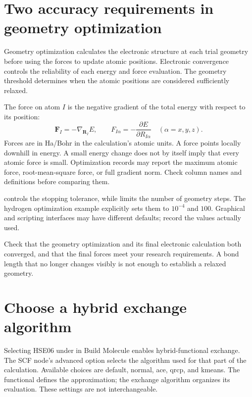 \section{Two accuracy requirements in geometry optimization}

Geometry optimization calculates the electronic structure at each trial geometry before using the forces to update atomic positions. Electronic convergence controls the reliability of each energy and force evaluation. The geometry threshold determines when the atomic positions are considered sufficiently relaxed.

The force on atom $I$ is the negative gradient of the total energy with respect to its position:
\begin{equation}
  \mathbf F_I=-\nabla_{\mathbf R_I}E,
  \qquad F_{I\alpha}=-\frac{\partial E}{\partial R_{I\alpha}}
  \quad(\alpha=x,y,z).
  \label{eq:atomic-force}
\end{equation}
Forces are in Ha/Bohr in the calculation's atomic units. A force points locally downhill in energy. A small energy change does not by itself imply that every atomic force is small. Optimization records may report the maximum atomic force, root-mean-square force, or full gradient norm. Check column names and definitions before comparing them.

 controls the stopping tolerance, while  limits the number of geometry steps. The hydrogen optimization example explicitly sets them to $10^{-4}$ and $100$. Graphical and scripting interfaces may have different defaults; record the values actually used.

Check that the geometry optimization and its final electronic calculation both converged, and that the final forces meet your research requirements. A bond length that no longer changes visibly is not enough to establish a relaxed geometry.

\section{Choose a hybrid exchange algorithm}

Selecting HSE06 under  in Build Molecule enables hybrid-functional exchange. The SCF node's advanced  option selects the algorithm used for that part of the calculation. Available choices are default, normal, ace, qrcp, and kmeans. The functional defines the approximation; the exchange algorithm organizes its evaluation. These settings are not interchangeable.

